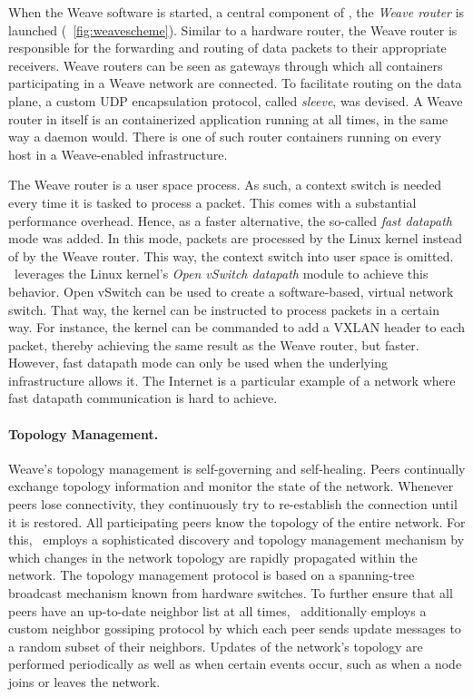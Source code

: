 When the Weave software is started, a central component of \wnet , the \emph{Weave router} is launched (\cf\ \autoref{fig:weavescheme}). Similar to a hardware router, the Weave router is responsible for the forwarding and routing of data packets to their appropriate receivers. Weave routers can be seen as gateways through which all containers participating in a Weave network are connected. To facilitate routing on the data plane, a custom UDP encapsulation protocol, called \emph{sleeve}, was devised. A Weave router in itself is an containerized application running at all times, in the same way a daemon would. There is one of such router containers running on every host in a Weave-enabled infrastructure.

The Weave router is a user space process. As such, a context switch is needed every time it is tasked to process a packet. This comes with a substantial performance overhead. Hence, as a faster alternative, the so-called \emph{fast datapath} mode was added. In this mode, packets are processed by the Linux kernel instead of by the Weave router. This way, the context switch into user space is omitted. \wnet\ leverages the Linux kernel's \emph{Open vSwitch datapath} module \cite{pfaff2015design} to achieve this behavior. Open vSwitch can be used to create a software-based, virtual network switch. That way, the kernel can be instructed to process packets in a certain way. For instance, the kernel can be commanded to add a VXLAN header to each packet, thereby achieving the same result as the Weave router, but faster. However, fast datapath mode can only be used when the underlying infrastructure allows it. The Internet is a particular example of a network where fast datapath communication is hard to achieve.


\paragraph{Topology Management.} 
Weave's topology management is self-governing and self-healing. Peers continually exchange topology information and monitor the state of the network. Whenever peers lose connectivity, they continuously try to re-establish the connection until it is restored. All participating peers know the topology of the entire network. For this, \wnet\ employs a sophisticated discovery and topology management mechanism by which changes in the network topology are rapidly propagated within the network. The topology management protocol is based on a spanning-tree broadcast mechanism known from hardware switches. To further ensure that all peers have an up-to-date neighbor list at all times, \wnet\ additionally employs a custom neighbor gossiping protocol by which each peer sends update messages to a random subset of their neighbors. Updates of the network's topology are performed periodically as well as when certain events occur, such as when a node joins or leaves the network.


